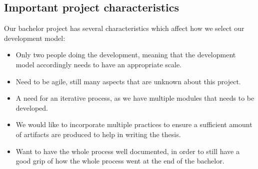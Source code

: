 \subsection{Important project characteristics}
Our bachelor project has several characteristics which affect how we select our development model:

\begin{itemize}

    \item Only two people doing the development, meaning that the development model accordingly needs to have an appropriate scale.
    \item Need to be agile, still many aspects that are unknown about this project.
    \item A need for an iterative process, as we have multiple modules that needs to be developed.
    \item We would like to incorporate multiple practices to ensure a sufficient amount of artifacts are produced to help in writing the thesis.
    \item Want to have the whole process well documented, in order to still have a good grip of how the whole process went at the end of the bachelor. 

\end{itemize}
